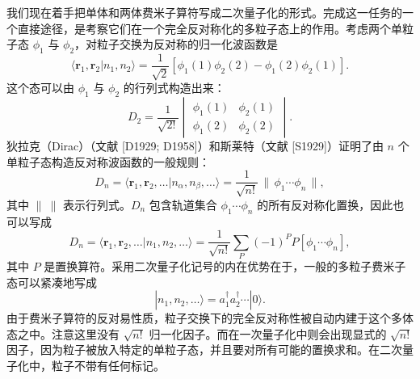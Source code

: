 我们现在着手把单体和两体费米子算符写成二次量子化的形式。完成这一任务的一个直接途径，是考察它们在一个完全反对称化的多粒子态上的作用。考虑两个单粒子态 $\phi_1$ 与 $\phi_2$，对粒子交换为反对称的归一化波函数是
\begin{equation*}
\langle \mathbf{r}_1,\mathbf{r}_2|n_1,n_2\rangle=\frac{1}{\sqrt{2}}\left[\phi_1(1)\phi_2(2)-\phi_1(2)\phi_2(1)\right].
\tag{4.23}
\end{equation*}
这个态可以由 $\phi_1$ 与 $\phi_2$ 的行列式构造出来：
\begin{equation*}
D_2=\frac{1}{\sqrt{2!}}
\begin{vmatrix}
\phi_1(1) & \phi_2(1) \\
\phi_1(2) & \phi_2(2)
\end{vmatrix}.
\tag{4.24}
\end{equation*}
狄拉克（Dirac）（文献 [D1929; D1958]）和斯莱特（文献 [S1929]）证明了由 $n$ 个单粒子态构造反对称波函数的一般规则：
\begin{equation*}
D_n=\langle \mathbf{r}_1,\mathbf{r}_2,\ldots|n_\alpha,n_\beta,\ldots\rangle=\frac{1}{\sqrt{n!}}\,\|\,\phi_1\cdots\phi_n\,\|,
\tag{4.25}
\end{equation*}
其中 $\|\ \|$ 表示行列式。$D_n$ 包含轨道集合 $\phi_1\cdots\phi_n$ 的所有反对称化置换，因此也可以写成
\begin{equation*}
D_n=\langle \mathbf{r}_1,\mathbf{r}_2,\ldots|n_1,n_2,\ldots\rangle=\frac{1}{\sqrt{n!}}\sum_P(-1)^P P[\phi_1\cdots\phi_n],
\tag{4.26}
\end{equation*}
其中 $P$ 是置换算符。采用二次量子化记号的内在优势在于，一般的多粒子费米子态可以紧凑地写成
\begin{equation*}
|n_1,n_2,\ldots\rangle=a_1^\dagger a_2^\dagger\cdots|0\rangle.
\tag{4.27}
\end{equation*}
由于费米子算符的反对易性质，粒子交换下的完全反对称性被自动内建于这个多体态之中。注意这里没有 $\sqrt{n!}$ 归一化因子。而在一次量子化中则会出现显式的 $\sqrt{n!}$ 因子，因为粒子被放入特定的单粒子态，并且要对所有可能的置换求和。在二次量子化中，粒子不带有任何标记。

